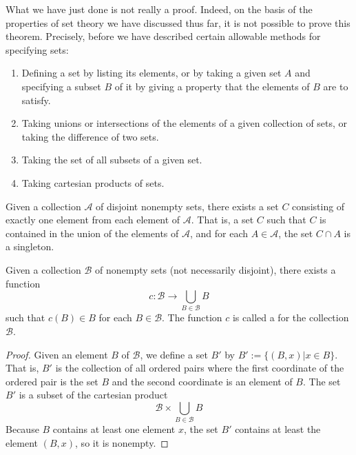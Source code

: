 \documentclass[12pt, a4paper, oneside, openright, titlepage]{book}
\begin{document}
\begin{appendices}
    \begin{rmk}
        What we have just done is not really a proof. Indeed, on the basis of the properties of set theory we have discussed thus far, it is not possible to prove this theorem. Precisely, before we have described certain allowable methods for specifying sets:\begin{enumerate}
            \item Defining a set by listing its elements, or by taking a given set $A$ and specifying a subset $B$ of it by giving a property that the elements of $B$ are to satisfy.
            \item Taking unions or intersections of the elements of a given collection of sets, or taking the difference of two sets.
            \item Taking the set of all subsets of a given set.
            \item Taking cartesian products of sets.
        \end{enumerate}
    \end{rmk}

    \begin{axi}
        Given a collection $\mathscr{A}$ of disjoint nonempty sets, there exists a set $C$ consisting of exactly one element from each element of $\mathscr{A}$. That is, a set $C$ such that $C$ is contained in the union of the elements of $\mathscr{A}$, and for each $A \in \mathscr{A}$, the set $C\cap A$ is a singleton.
    \end{axi}

    \begin{lem}
        Given a collection $\mathscr{B}$ of nonempty sets (not necessarily disjoint), there exists a function \begin{equation}
            c:\mathscr{B}\rightarrow \bigcup\limits_{B\in\mathscr{B}}B
        \end{equation}
        such that $c(B) \in B$ for each $B \in \mathscr{B}$. The function $c$ is called a  for the collection $\mathscr{B}$.
    \end{lem}
    \begin{proof}
        Given an element $B$ of $\mathscr{B}$, we define a set $B'$ by $B' :=\{(B,x)\vert x \in B\}$. That is, $B'$ is the collection of all ordered pairs where the first coordinate of the ordered pair is the set $B$ and the second coordinate is an element of $B$. The set $B'$ is a subset of the cartesian product \begin{equation*}
            \mathscr{B}\times \bigcup\limits_{B\in \mathscr{B}}B
        \end{equation*}
        Because $B$ contains at least one element $x$, the set $B'$ contains at least the element $(B,x)$, so it is nonempty.


\end{proof}
\end{appendices}
\end{document}
